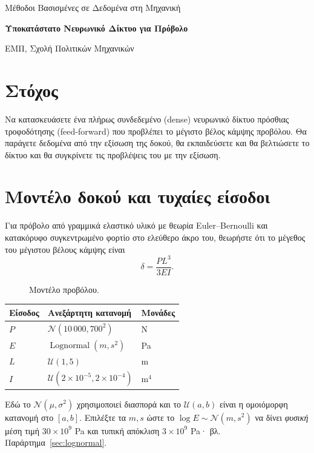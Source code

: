 \documentclass[11pt]{article}
\newcommand{\unit}[1]{\textlatin{#1}}
\begin{document}
\begin{center}
  {\large Μέθοδοι Βασισμένες σε Δεδομένα στη Μηχανική\par}
  \vspace{0.4em}
  {\LARGE\bfseries Υποκατάστατο Νευρωνικό Δίκτυο για Πρόβολο\par}
  \vspace{0.3em}
  {ΕΜΠ, Σχολή Πολιτικών Μηχανικών\par}
\end{center}

\section*{Στόχος}
\aitrap Να κατασκευάσετε ένα πλήρως συνδεδεμένο (\textlatin{dense}) νευρωνικό δίκτυο πρόσθιας τροφοδότησης (\textlatin{feed-forward}) που προβλέπει το μέγιστο βέλος κάμψης προβόλου. Θα παράγετε δεδομένα από την εξίσωση της δοκού, θα εκπαιδεύσετε και θα βελτιώσετε το δίκτυο και θα συγκρίνετε τις προβλέψεις του με την εξίσωση.

\section*{Μοντέλο δοκού και τυχαίες είσοδοι}
Για πρόβολο από γραμμικά ελαστικό υλικό με θεωρία \textlatin{Euler--Bernoulli} και κατακόρυφο συγκεντρωμένο φορτίο στο ελεύθερο άκρο του, θεωρήστε ότι το μέγεθος του μέγιστου βέλους κάμψης είναι
\[
  \boxed{\delta=\frac{PL^3}{3EI}}.
\]

\begin{figure}[htbp]
  \centering
  \cantileverdrawing
  \caption{Μοντέλο προβόλου.}
\end{figure}

\begin{center}
\begin{tabular}{@{}lll@{}}
\toprule
Είσοδος & Ανεξάρτητη κατανομή & Μονάδες \\
\midrule
$P$ & $\mathcal N(10\,000,700^2)$ & \unit{N} \\
$E$ & $\operatorname{Lognormal}(m,s^2)$ & \unit{Pa} \\
$L$ & $\mathcal U(1,5)$ & \unit{m} \\
$I$ & $\mathcal U(2\times10^{-5},2\times10^{-4})$ & \unit{m}$^4$ \\
\bottomrule
\end{tabular}
\end{center}

Εδώ το $\mathcal N(\mu,\sigma^2)$ χρησιμοποιεί διασπορά και το $\mathcal U(a,b)$ είναι η ομοιόμορφη κατανομή στο $[a,b]$. Επιλέξτε τα $m,s$ ώστε το $\log E\sim\mathcal N(m,s^2)$ να δίνει \emph{φυσική} μέση τιμή $30\times10^9$ \unit{Pa} και τυπική απόκλιση $3\times10^9$ \unit{Pa}· βλ. Παράρτημα~\ref{sec:lognormal}.
\end{document}
